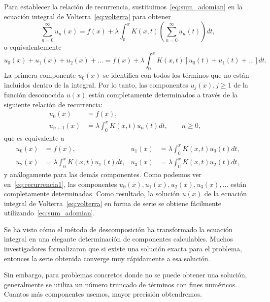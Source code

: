 Para establecer la relación de recurrencia, sustituimos~\eqref{eq:sum_adomian} en la ecuación integral de Volterra~\eqref{eq:volterra} para obtener 
\begin{equation}
	\sum_{n=0}^{\infty} u_n(x) = f(x) + \lambda \int_{0}^{x} K(x,t)(\sum_{n=0}^{\infty} u_n(t))dt,
\end{equation}
o equivalentemente
\begin{equation}
	u_0(x) + u_1(x) + u_2(x) + ... = f(x) + \lambda \int_{0}^{x} K(x,t)[u_0(t) + u_1(t) + ...]dt.
\end{equation}
La primera componente $u_0(x)$ se identifica con todos los términos que no están incluidos dentro de la integral. Por lo tanto, las componentes $u_j(x), j \geqslant 1$ de la función desconocida $u(x)$ están completamente determinados a través de la siguiente relación de recurrencia:
\begin{align}
	u_0(x) &= f(x),      &   \\
	u_{n+1}(x) &= \lambda \int_{0}^{x} K(x,t)u_n(t)dt, \qquad n \geqslant 0,         & 
\end{align}
que es equivalente a 
\begin{align}\label{eq:recurrencia1}
	u_0(x)&=f(x),          &  u_1(x) &=\lambda \int_{0}^{x} K(x,t)u_0(t)dt,      \\
	u_2(x)&=\lambda \int_{0}^{x} K(x,t)u_1(t)dt,   &  u_3(x)&=\lambda \int_{0}^{x} K(x,t)u_2(t)dt, 
\end{align}
y análogamente para las demás componentes. Como podemos ver en~\eqref{eq:recurrencia1}, las componentes $u_0(x), u_1(x), u_2(x), u_3(x),...$ están completamente determinadas. Como resultado, la solución $u(x)$ de la ecuación integral de Volterra~\eqref{eq:volterra} en forma de serie se obtiene fácilmente utilizando~\eqref{eq:sum_adomian}.

\begin{observacion}
Se ha visto cómo el método de descomposición ha transformado la ecuación integral en una elegante determinación de componentes calculables. Muchos investigadores formalizaron que si existe una solución exacta para el problema, entonces la serie obtenida converge muy rápidamente a esa solución.

Sin embargo, para problemas concretos donde no se puede obtener una solución, generalmente se utiliza un número truncado de términos con fines numéricos. Cuantos más componentes usemos, mayor precisión obtendremos.
\end{observacion}


